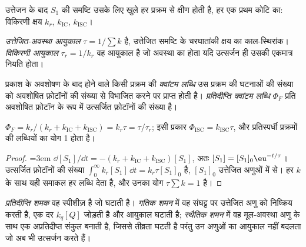 उत्तेजन के बाद $S_1$ की समष्टि उसके लिए खुले हर प्रक्रम से क्षीण होती है,
हर एक प्रथम कोटि का: विकिरणी क्षय $k_r$,  $k_{\mathrm{IC}}$,
 $k_{\mathrm{ISC}}$।

\begin{definition}[उत्तेजित-अवस्था आयुकाल, विकिरणी आयुकाल]\label{def:b3:electronic-spectroscopy:lifetime}
\emph{उत्तेजित-अवस्था आयुकाल} $\tau =
1/\sum k$ है, उत्तेजित समष्टि के चरघातांकी क्षय का काल-स्थिरांक।
\emph{विकिरणी आयुकाल} $\tau_r =
1/k_r$ वह आयुकाल है जो अवस्था का होता यदि उत्सर्जन ही उसकी एकमात्र
नियति होता।
\end{definition}

\begin{definition}[क्वांटम लब्धि]\label{def:b3:electronic-spectroscopy:quantum-yield}
प्रकाश के अवशोषण के बाद होने वाले किसी प्रक्रम की \emph{क्वांटम लब्धि}
उस प्रक्रम की घटनाओं की संख्या को अवशोषित फ़ोटॉनों की संख्या से विभाजित करने पर
प्राप्त होती है। \emph{प्रतिदीप्ति क्वांटम
लब्धि} $\Phi_F$ प्रति अवशोषित फ़ोटॉन  के रूप में
उत्सर्जित फ़ोटॉनों की संख्या है।
\end{definition}

\begin{proposition}[क्वांटम लब्धि और आयुकाल]\label{prop:b3:electronic-spectroscopy:quantum-yield}
$\Phi_F = k_r/(k_r + k_{\mathrm{IC}} + k_{\mathrm{ISC}}) = k_r\tau = \tau/\tau_r$; इसी प्रकार
$\Phi_{\mathrm{ISC}} = k_{\mathrm{ISC}}\tau$, और प्रतिस्पर्धी प्रक्रमों की लब्धियों का योग
1 होता है।
\end{proposition}

\begin{proof}
\emergencystretch=3em $\dd[S_1]/\dd t = -(k_r + k_{\mathrm{IC}} + k_{\mathrm{ISC}})[S_1]$, अतः $[S_1] = [S_1]_0\eu^{-t/\tau}$।
उत्सर्जित फ़ोटॉनों की संख्या $\int_0^\infty k_r[S_1]\,\dd t = k_r\tau[S_1]_0$ है,
$[S_1]_0$ उत्तेजित अणुओं में से। हर $k$ के साथ यही समाकल हर लब्धि देता है,
और उनका योग $\tau\sum k = 1$ है।
\end{proof}

\begin{definition}\label{def:b3:electronic-spectroscopy:quencher}
\emph{प्रतिदीप्ति शमक} वह स्पीशीज़ है जो
 घटाती है। \emph{गतिक शमन} में वह
संघट्ट पर उत्तेजित अणु को निष्क्रिय करती है, एक दर $k_q[Q]$ जोड़ती है और
आयुकाल घटाती है; \emph{स्थैतिक शमन} में वह
मूल-अवस्था अणु के साथ एक अप्रतिदीप्त संकुल बनाती है, जिससे
तीव्रता घटती है परंतु उन अणुओं का आयुकाल नहीं बदलता जो अब भी उत्सर्जन करते हैं।
\end{definition}

